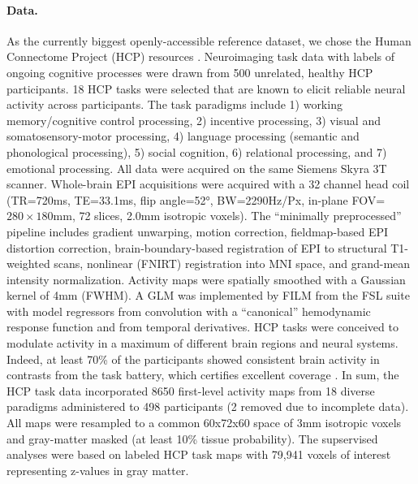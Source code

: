 \documentclass{article} %
\begin{document}
\paragraph{Data.}
As the currently biggest openly-accessible reference dataset,
we chose the Human Connectome Project (HCP) resources
\cite{barch2013}.
Neuroimaging task data with labels of ongoing cognitive processes
were drawn from 500 unrelated,
healthy HCP participants.
18 HCP tasks 
were selected that are known to elicit reliable neural activity
across participants.
The task paradigms include
1) working memory/cognitive control processing, 2)
incentive processing, 3) visual and somatosensory-motor processing,
4) language processing (semantic and phonological processing),
5) social cognition, 6) relational processing, and 7) emotional
processing. All data were acquired on the same Siemens Skyra 3T scanner.
Whole-brain EPI acquisitions were acquired with a
32 channel head coil (TR=720ms, TE=33.1ms, flip angle=52°, BW=2290Hz/Px,
in-plane FOV=$280\times180$mm, 72 slices, 2.0mm isotropic voxels).
The ``minimally preprocessed'' pipeline includes
gradient unwarping, motion correction, fieldmap-based EPI distortion
correction, brain-boundary-based registration of EPI to structural
T1-weighted scans, nonlinear (FNIRT) registration into MNI space,
and grand-mean intensity normalization. Activity maps were spatially
smoothed with a Gaussian kernel of 4mm (FWHM). A GLM was
implemented by FILM from the FSL suite with model regressors from convolution
with a “canonical” hemodynamic response function and from temporal derivatives.
HCP tasks were conceived to modulate activity
in a maximum of different brain regions and neural systems. Indeed, at
least 70\% of the participants showed consistent brain activity in
contrasts from the task battery, which certifies excellent
coverage \cite{barch2013}.
%
%
In sum, the HCP task data incorporated 8650 first-level activity maps
from 18 diverse paradigms administered to 498 participants (2 removed
due to incomplete data).
All maps were resampled to a common 60x72x60 space of
3mm isotropic voxels and gray-matter masked (at least 10\% tissue
probability).
The supservised analyses were based on labeled HCP task maps with
79,941 voxels of interest representing z-values in gray matter.
\end{document}
